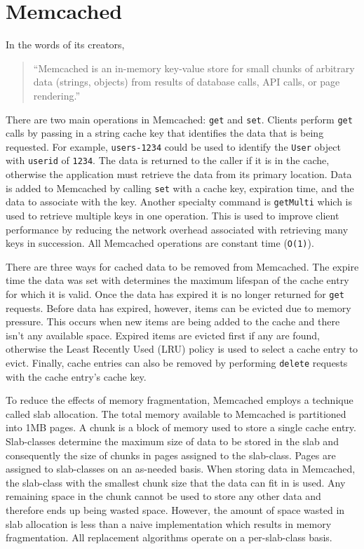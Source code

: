 \documentclass[12pt]{ucthesis}
\begin{document}
\section{Memcached}
In the words of its creators, \begin{quotation}``Memcached is an in-memory key-value store for small chunks of arbitrary data (strings, objects) from results of database calls, API calls, or page rendering\cite{memcachedDotOrg}.''\end{quotation}
There are two main operations in \textsf{Memcached}: {\tt get} and {\tt set}.
Clients perform {\tt get} calls by passing in a string cache key that identifies the data that is being requested.
For example, {\tt users-1234} could be used to identify the {\tt User} object with {\tt userid} of {\tt 1234}.
The data is returned to the caller if it is in the cache, otherwise the application must retrieve the data from its primary location.
Data is added to \textsf{Memcached} by calling {\tt set} with a cache key, expiration time, and the data to associate with the key.
Another specialty command is {\tt getMulti} which is used to retrieve multiple keys in one operation.
This is used to improve client performance by reducing the network overhead associated with retrieving many keys in succession.
All \textsf{Memcached} operations are constant time ({\tt O(1)}).

There are three ways for cached data to be removed from \textsf{Memcached}.
The expire time the data was set with determines the maximum lifespan of the cache entry for which it is valid.
Once the data has expired it is no longer returned for {\tt get} requests.
Before data has expired, however, items can be evicted due to memory pressure.
This occurs when new items are being added to the cache and there isn't any available space.
Expired items are evicted first if any are found, otherwise the Least Recently Used (LRU) policy is used to select a cache entry to evict.
Finally, cache entries can also be removed by performing {\tt delete} requests with the cache entry's cache key.

To reduce the effects of memory fragmentation, \textsf{Memcached} employs a technique called slab allocation.
The total memory available to \textsf{Memcached} is partitioned into 1MB pages.
A chunk is a block of memory used to store a single cache entry.
Slab-classes determine the maximum size of data to be stored in the slab and consequently the size of chunks in pages assigned to the slab-class.
Pages are assigned to slab-classes on an as-needed basis.
When storing data in \textsf{Memcached}, the slab-class with the smallest chunk size that the data can fit in is used.
Any remaining space in the chunk cannot be used to store any other data and therefore ends up being wasted space.
However, the amount of space wasted in slab allocation is less than a naive implementation which results in memory fragmentation.
All replacement algorithms operate on a per-slab-class basis.
\end{document}
